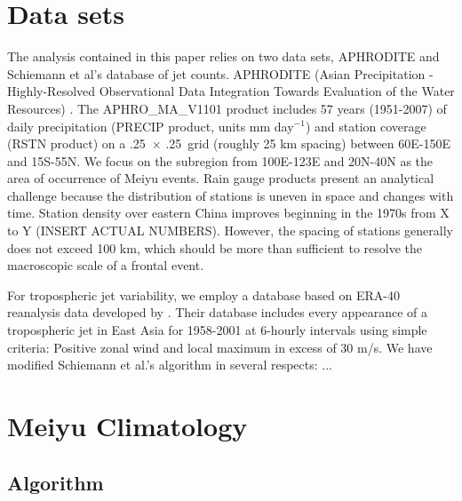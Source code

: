 \documentclass[draft,grl]{AGUTeX}
\begin{document}
\begin{article}
	
\section{Data sets}

	The analysis contained in this paper relies on two data sets, APHRODITE and Schiemann et al's database of jet counts. APHRODITE (Asian Precipitation - Highly-Resolved Observational Data Integration Towards Evaluation of the Water Resources) \citep{Yatagai2012}. The APHRO\_MA\_V1101 product includes 57 years (1951-2007) of daily precipitation (PRECIP product, units mm day$^{-1}$) and station coverage (RSTN product) on a .25\textdegree\ $\times$ .25\textdegree\ grid (roughly 25 km spacing) between 60\textdegree E-150\textdegree E and 15\textdegree S-55\textdegree N. We focus on the subregion from 100E-123E and 20N-40N as the area of occurrence of Meiyu events. Rain gauge products present an analytical challenge because the distribution of stations is uneven in space and changes with time. Station density over eastern China improves beginning in the 1970s from X to Y (INSERT ACTUAL NUMBERS). However, the spacing of stations generally does not exceed 100 km, which should be more than sufficient to resolve the macroscopic scale of a frontal event.

	For tropospheric jet variability, we employ a database based on ERA-40 reanalysis data developed by \citet{Schiemann2009}. Their database includes every appearance of a tropospheric jet in East Asia for 1958-2001 at 6-hourly intervals using simple criteria: Positive zonal wind and local maximum in excess of 30 m/s. We have modified Schiemann et al.'s algorithm in several respects: ...
	
\section{Meiyu Climatology}
\subsection{Algorithm}


\end{article}
\end{document}
